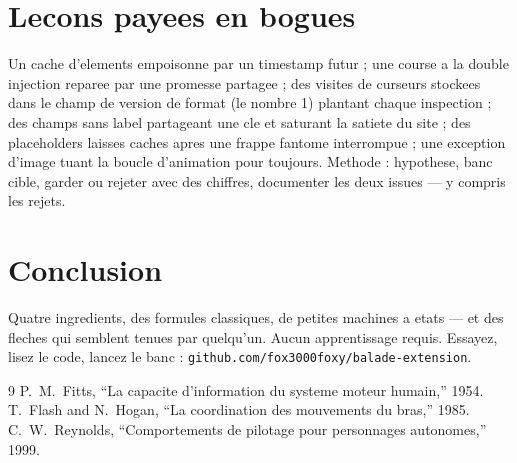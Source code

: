 \documentclass[10pt,conference]{IEEEtran}
\begin{document}
\section{Lecons payees en bogues}
Un cache d'elements empoisonne par un timestamp futur ; une course a la
double injection reparee par une promesse partagee ; des visites de curseurs
stockees dans le champ de version de format (le nombre 1) plantant chaque
inspection ; des champs sans label partageant une cle et saturant la satiete
du site ; des placeholders laisses caches apres une frappe fantome interrompue ;
une exception d'image tuant la boucle d'animation pour toujours. Methode :
hypothese, banc cible, garder ou rejeter avec des chiffres, documenter les deux
issues --- y compris les rejets.

\section{Conclusion}
Quatre ingredients, des formules classiques, de petites machines a etats ---
et des fleches qui semblent tenues par quelqu'un. Aucun apprentissage requis.
Essayez, lisez le code, lancez le banc :
\texttt{github.com/fox3000foxy/balade-extension}.
\begin{thebibliography}{9}
 P.~M.~Fitts, ``La capacite d'information du systeme moteur humain,'' 1954.
 T.~Flash and N.~Hogan, ``La coordination des mouvements du bras,'' 1985.
 C.~W.~Reynolds, ``Comportements de pilotage pour personnages autonomes,'' 1999.
\end{thebibliography}
\end{document}
